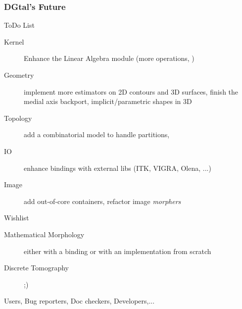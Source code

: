 \documentclass[8pt]{beamer}
\begin{document}
\begin{frame}
  \frametitle{DGtal's Future}
  
  \begin{block}{ToDo List}
    \begin{description}
    \item [Kernel] Enhance the Linear Algebra module (more operations, )
    \item [Geometry] implement more estimators on 2D contours and 3D
      surfaces, finish the medial axis backport, implicit/parametric
      shapes in 3D
    \item [Topology] add a combinatorial model to handle partitions, 
    \item [IO] enhance bindings with external libs (ITK, VIGRA, Olena,
      ...)
    \item[Image] add out-of-core containers, refactor image \emph{morphers}    
    \end{description}
  \end{block}
  
  
  \begin{exampleblock}{Wishlist}
    \begin{description}
    \item [Mathematical Morphology] either with a binding or with an
      implementation from scratch
    \item [Discrete Tomography] ;)
    \end{description}
  \end{exampleblock}


  \begin{alertblock}{}
    \alert{Users, Bug reporters,  Doc checkers, Developers,...}
  \end{alertblock}

\end{frame}
\end{document}
